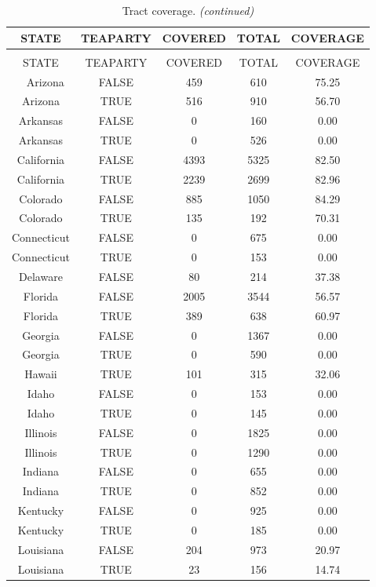 \documentclass[
]{article}
\begin{document}
\begin{longtable}[t]{ccccc}
\caption{\label{tab:coverage}Tract coverage.}\\
\toprule
STATE & TEAPARTY & COVERED & TOTAL & COVERAGE\\
\midrule
\endfirsthead
\caption[]{\label{tab:coverage}Tract coverage. \textit{(continued)}}\\
\toprule
STATE & TEAPARTY & COVERED & TOTAL & COVERAGE\\
\midrule
\endhead
\
\endfoot
\bottomrule
\endlastfoot
Arizona & FALSE & 459 & 610 & 75.25\\
Arizona & TRUE & 516 & 910 & 56.70\\
Arkansas & FALSE & 0 & 160 & 0.00\\
Arkansas & TRUE & 0 & 526 & 0.00\\
California & FALSE & 4393 & 5325 & 82.50\\
\addlinespace
California & TRUE & 2239 & 2699 & 82.96\\
Colorado & FALSE & 885 & 1050 & 84.29\\
Colorado & TRUE & 135 & 192 & 70.31\\
Connecticut & FALSE & 0 & 675 & 0.00\\
Connecticut & TRUE & 0 & 153 & 0.00\\
\addlinespace
Delaware & FALSE & 80 & 214 & 37.38\\
Florida & FALSE & 2005 & 3544 & 56.57\\
Florida & TRUE & 389 & 638 & 60.97\\
Georgia & FALSE & 0 & 1367 & 0.00\\
Georgia & TRUE & 0 & 590 & 0.00\\
\addlinespace
Hawaii & TRUE & 101 & 315 & 32.06\\
Idaho & FALSE & 0 & 153 & 0.00\\
Idaho & TRUE & 0 & 145 & 0.00\\
Illinois & FALSE & 0 & 1825 & 0.00\\
Illinois & TRUE & 0 & 1290 & 0.00\\
\addlinespace
Indiana & FALSE & 0 & 655 & 0.00\\
Indiana & TRUE & 0 & 852 & 0.00\\
Kentucky & FALSE & 0 & 925 & 0.00\\
Kentucky & TRUE & 0 & 185 & 0.00\\
Louisiana & FALSE & 204 & 973 & 20.97\\
\addlinespace
Louisiana & TRUE & 23 & 156 & 14.74\\

\end{longtable}
\end{document}
